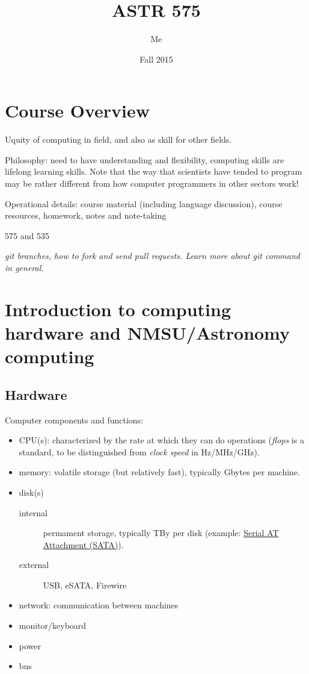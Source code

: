 \documentclass{article}
\title{ASTR 575}
\author{Me}
\date{Fall 2015}
\newcommand{\test}[1]{%
    \begin{center}
        \colorbox{hl}{\parbox{0.9\textwidth}{\emph{#1}}}
    \end{center}}
\begin{document}
\maketitle
{}
\tableofcontents

\renewcommand{\descriptionlabel}[1]{%
    \ttfamily{#1}}

\section{Course Overview}
Uquity of computing in field, and also as skill for other fields.

Philosophy: need to have understanding and flexibility, computing
skills are lifelong learning skills. Note that the way that scientists
have tended to program may be rather different from how computer
programmers in other sectors work!

Operational details: course material (including language discussion),
course resources, homework, notes and note-taking

575 and 535

\test{git branches, how to fork and send pull requests. Learn more
about git command in general.}


\section{Introduction to computing hardware and NMSU/Astronomy computing}

\subsection{Hardware}
Computer components and functions:
\begin{itemize}
    \item CPU(s): characterized by the rate at which they can do
        operations (\textit{flops} is a standard, to be distinguished from
        \textit{clock speed} in Hz/MHz/GHz).
    \item memory: volatile storage (but relatively fast),
        typically Gbytes per machine.
    \item disk(s)
        \begin{description}%
            \item [internal] permament storage, typically TBy per disk
                (example: \href{https://en.wikipedia.org/wiki/Serial_ATA}
                {Serial AT Attachment (SATA)}).
            \item [external] USB, eSATA, Firewire
        \end{description}
    \item network: communication between machines
    \item monitor/keyboard
    \item power
    \item bus
\end{itemize}
\end{document}
